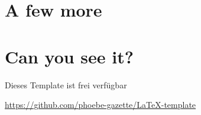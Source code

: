 \documentclass{phoebe}
\begin{document}
\Blindtext

\section{A few more}

\Blindtext 

\section{Can you see it?}

\Blindtext

Dieses Template ist frei verfügbar
\begin{center}
    \url{https://github.com/phoebe-gazette/LaTeX-template}
\end{center}



\printbibliography[title = {References}]


\end{document}
